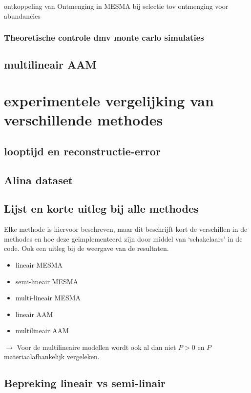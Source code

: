 \documentclass[12pt]{report}
\begin{document}
ontkoppeling van Ontmenging in MESMA bij selectie tov ontmenging voor abundancies

\subsection{Theoretische controle dmv monte carlo simulaties}

\section{multilineair AAM}

\chapter{experimentele vergelijking van verschillende methodes}

\section{looptijd en reconstructie-error}

\section{Alina dataset}

\section{Lijst en korte uitleg bij alle methodes}

Elke methode is hiervoor beschreven, maar dit beschrijft kort de verschillen in de methodes en hoe deze geimplementeerd zijn door middel van `schakelaars' in de code. Ook een uitleg bij de weergave van de resultaten. 

\begin{itemize}
\item lineair MESMA
\item semi-lineair MESMA
\item multi-lineair MESMA
\item lineair AAM
\item multilineair AAM
\end{itemize}

$\rightarrow$ Voor de multilineaire modellen wordt ook al dan niet $P> 0$ en $P$ materiaalafhankelijk vergeleken.



\section{Bepreking lineair vs semi-linair}
\end{document}
